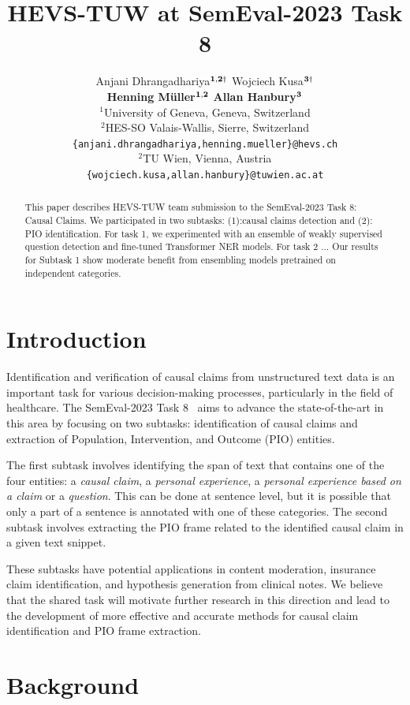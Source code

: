 \documentclass[11pt]{article}
\title{HEVS-TUW at SemEval-2023 Task 8}
\author{Anjani Dhrangadhariya\hspace{1pt}$^{{{\bf 1,2}}\dag}$ \hspace{.7cm} Wojciech Kusa\hspace{1pt}$^{{\bf 3}\dag}$ \\[0.15cm] {\bf Henning Müller\hspace{1pt}$^{{\bf 1,2}}$}  \hspace{.7cm}  {\bf Allan Hanbury\hspace{1pt}$^{{\bf 3}}$}
\\[0.4cm]
{$^1$University of Geneva, Geneva, Switzerland} \\
{$^2$HES-SO Valais-Wallis, Sierre, Switzerland} \\
{\tt \{anjani.dhrangadhariya,henning.mueller\}@hevs.ch} \\
{$^2$TU Wien, Vienna, Austria} \\
{\tt \{wojciech.kusa,allan.hanbury\}@tuwien.ac.at} \\
}
\begin{document}
\maketitle
{\let\thefootnote\relax{}}

\begin{abstract}
This paper describes HEVS-TUW team submission to the SemEval-2023 Task 8: Causal Claims.
We participated in two subtasks: (1):causal claims detection and (2): PIO identification.
For task 1, we experimented with an ensemble of weakly supervised question detection and fine-tuned Transformer NER models.
For task 2 ...
Our results for Subtask 1 show moderate benefit from ensembling models pretrained on independent categories.

\end{abstract}

\section{Introduction}

% 
Identification and verification of causal claims from unstructured text data is an important task for various decision-making processes, particularly in the field of healthcare. The SemEval-2023 Task 8~\cite{CausalClaims} aims to advance the state-of-the-art in this area by focusing on two subtasks: identification of causal claims and extraction of Population, Intervention, and Outcome (PIO) entities.

% 
The first subtask involves identifying the span of text that contains one of the four entities: a \emph{causal claim}, a \emph{personal experience}, a \emph{personal experience based on a claim} or a \emph{question}. 
This can be done at sentence level, but it is possible that only a part of a sentence is annotated with one of these categories. 
The second subtask involves extracting the PIO frame related to the identified causal claim in a given text snippet.

These subtasks have potential applications in content moderation, insurance claim identification, and hypothesis generation from clinical notes. We believe that the shared task will motivate further research in this direction and lead to the development of more effective and accurate methods for causal claim identification and PIO frame extraction.



\section{Background}
\end{document}

